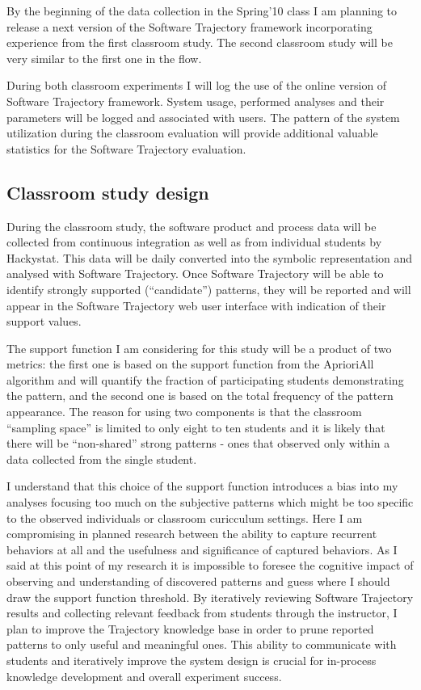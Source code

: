 By the beginning of the data collection in the Spring'10 class I am planning to release a next version of the Software Trajectory framework incorporating experience from the first classroom study. The second classroom study will be very similar to the first one in the flow. 

During both classroom experiments I will log the use of the online version of Software Trajectory framework. System usage, performed analyses and their parameters will be logged and associated with users. The pattern of the system utilization during the classroom evaluation will provide additional valuable statistics for the Software Trajectory evaluation.

\subsection{Classroom study design}
During the classroom study, the software product and process data will be collected from continuous integration as well as from individual students by Hackystat. This data will be daily converted into the symbolic representation and analysed with Software Trajectory. Once Software Trajectory will be able to identify strongly supported (``candidate'') patterns, they will be reported and will appear in the Software Trajectory web user interface with indication of their support values.

The support function I am considering for this study will be a product of two metrics: the first one is based on the support function from the AprioriAll algorithm and will quantify the fraction of participating students demonstrating the pattern, and the second one is based on the total frequency of the pattern appearance. The reason for using two components is that the classroom ``sampling space'' is limited to only eight to ten students and it is likely that there will be ``non-shared'' strong patterns - ones that observed only within a data collected from the single student.

I understand that this choice of the support function introduces a bias into my analyses focusing too much on the subjective patterns which might be too specific to the observed individuals or classroom curicculum settings. Here I am compromising in planned research between the ability to capture recurrent behaviors at all and the usefulness and significance of captured behaviors. As I said at this point of my research it is impossible to foresee the cognitive impact of observing and understanding  of discovered patterns and guess where I should draw the support function threshold. By iteratively reviewing Software Trajectory results and collecting relevant feedback from students through the instructor, I plan to improve the Trajectory knowledge base in order to prune reported patterns to only useful and meaningful ones. This ability to communicate with students and iteratively improve the system design is crucial for in-process knowledge development and overall experiment success.

